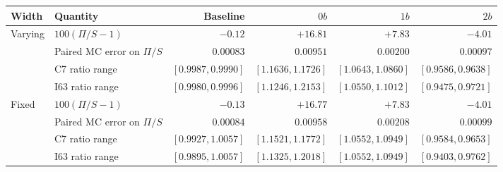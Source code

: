 \begin{tabular}{llrrrr}
\toprule
Width & Quantity & Baseline & $0b$ & $1b$ & $2b$ \\
\midrule
Varying & $100(\Pi/S-1)$ & $-0.12$ & $+16.81$ & $+7.83$ & $-4.01$ \\
 & Paired MC error on $\Pi/S$ & $0.00083$ & $0.00951$ & $0.00200$ & $0.00097$ \\
 & C7 ratio range & $[0.9987,0.9990]$ & $[1.1636,1.1726]$ & $[1.0643,1.0860]$ & $[0.9586,0.9638]$ \\
 & I63 ratio range & $[0.9980,0.9996]$ & $[1.1246,1.2153]$ & $[1.0550,1.1012]$ & $[0.9475,0.9721]$ \\
Fixed & $100(\Pi/S-1)$ & $-0.13$ & $+16.77$ & $+7.83$ & $-4.01$ \\
 & Paired MC error on $\Pi/S$ & $0.00084$ & $0.00958$ & $0.00208$ & $0.00099$ \\
 & C7 ratio range & $[0.9927,1.0057]$ & $[1.1521,1.1772]$ & $[1.0552,1.0949]$ & $[0.9584,0.9653]$ \\
 & I63 ratio range & $[0.9895,1.0057]$ & $[1.1325,1.2018]$ & $[1.0552,1.0949]$ & $[0.9403,0.9762]$ \\
\bottomrule
\end{tabular}
